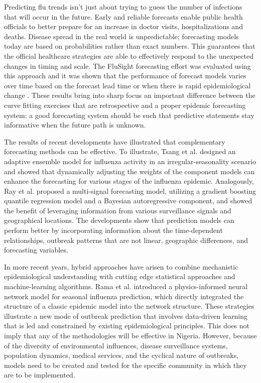 \documentclass[12pt,a4paper]{article}
\theoremstyle{definition}
\theoremstyle{remark}
\begin{document}
Predicting flu trends isn't just about trying to guess the number of infections that will occur in the future. Early and reliable forecasts enable public health officials to better prepare for an increase in doctor visits, hospitalizations and deaths. Disease spread in the real world is unpredictable; forecasting models today are based on probabilities rather than exact numbers. This guarantees that the official healthcare strategies are able to effectively respond to the unexpected changes in timing and scale. The FluSight forecasting effort was evaluated using this approach and it was shown that the performance of forecast models varies over time based on the forecast lead time or when there is rapid epidemiological change \cite{Mathis2024FluSight}. These results bring into sharp focus an important difference between the curve fitting exercises that are retrospective and a proper epidemic forecasting system: a good forecasting system should be such that predictive statements stay informative when the future path is unknown.

The results of recent developments have illustrated that complementary forecasting methods can be effective. To illustrate, Tsang et al. \cite{Tsang2024adaptive} designed an adaptive ensemble model for influenza activity in an irregular-seasonality scenario and showed that dynamically adjusting the weights of the component models can enhance the forecasting for various stages of the influenza epidemic. Analogously, Ray et al. \cite{Ray2025Flusion} proposed a multi-signal forecasting model, utilizing a gradient boosting quantile regression model and a Bayesian autoregressive component, and showed the benefit of leveraging information from various surveillance signals and geographical locations. The developments show that prediction models can perform better by incorporating information about the time-dependent relationships, outbreak patterns that are not linear, geographic differences, and forecasting variables.






In more recent years, hybrid approaches have arisen to combine mechanistic epidemiological understanding with cutting edge statistical approaches and machine-learning algorithms. Rama et al. \cite{Rama2026PINN} introduced a physics-informed neural network model for seasonal influenza prediction, which directly integrated the structure of a classic epidemic model into the network structure. These strategies illustrate a new mode of outbreak prediction that involves data-driven learning that is led and constrained by existing epidemiological principles. This does not imply that any of the methodologies will be effective in Nigeria. However, because of the diversity of environmental influences, disease surveillance systems, population dynamics, medical services, and the cyclical nature of outbreaks, models need to be created and tested for the specific community in which they are to be implemented.
\end{document}

